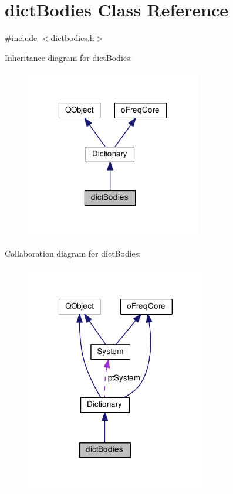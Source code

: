 \hypertarget{classdict_bodies}{\section{dict\-Bodies Class Reference}
\label{classdict_bodies}
}


{\ttfamily \#include $<$dictbodies.\-h$>$}



Inheritance diagram for dict\-Bodies\-:\nopagebreak
\begin{figure}[H]
\begin{center}
\leavevmode
\includegraphics[width=217pt]{classdict_bodies__inherit__graph}
\end{center}
\end{figure}


Collaboration diagram for dict\-Bodies\-:\nopagebreak
\begin{figure}[H]
\begin{center}
\leavevmode
\includegraphics[width=224pt]{classdict_bodies__coll__graph}
\end{center}
\end{figure}
